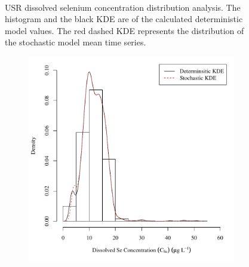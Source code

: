 \begin{linenumbers}
\begin{landscape}
\begin{figure}
\begin{subfigure}{0.7\textwidth}
		\end{subfigure}\\
		\caption[USR dissolved selenium concentration distribution analysis.]{USR dissolved selenium concentration distribution analysis.  The histogram and the black KDE are of the calculated deterministic model values.  The red dashed KDE represents the distribution of the stochastic model mean time series.}
		\label{fig:concCSeDist_US}
	\end{figure}
\end{landscape}

\subfiguremid
\begin{landscape}
	\begin{figure}
		\begin{subfigure}{0.7\textwidth}
			\centering
			\includegraphics[width=\tableCustomSize]{"Figures/Results_USR/Stochastic/c d&s est CAN"}
		\end{subfigure}%
		\begin{subfigure}{0.7\textwidth}
			\centering

\end{subfigure}
\end{figure}
\end{landscape}
\end{linenumbers}

